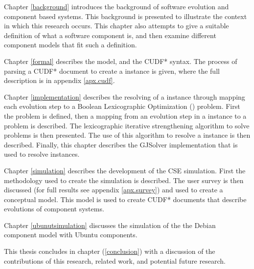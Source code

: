 Chapter \ref{background} introduces the background of software evolution and component based systems.
This background is presented to illustrate the context in which this research occurs.
This chapter also attempts to give a suitable definition of what a software component is, and then examine different component models that fit such a definition.

Chapter \ref{formal} describes the \modelname model, and the CUDF* syntax.
The process of parsing a CUDF* document to create a \modelname instance is given, where the full description is in appendix \ref{apx.cudf}.

Chapter \ref{implementation} describes the resolving of a \modelname instance through mapping each evolution step to a Boolean Lexicographic Optimization (\modelimpl) problem.
First the \modelimpl problem is defined, then a mapping from an evolution step in a \modelname instance to a \modelimpl problem is described.
The lexicographic iterative strengthening algorithm to solve \modelimpl problems is then presented.
The use of this algorithm to resolve a \modelname instance is then described.
Finally, this chapter describes the GJSolver implementation that is used to resolve \modelname instances.

Chapter \ref{simulation} describes the development of the CSE simulation.
First the methodology used to create the simulation is described.
The user survey is then discussed (for full results see appendix \ref{apx.survey}) and used to create a conceptual model.
This model is used to create CUDF* documents that describe evolutions of component systems. 

Chapter \ref{ubunutsimulation} discusses the simulation of the  the Debian component model \citep{Barth2005} with Ubuntu  components. 

This thesis concludes in chapter (\ref{conclusion}) with a discussion of the contributions of this research, related work, and potential future research.
